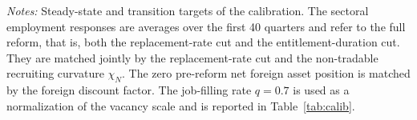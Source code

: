 \begin{table}[htbp!]
  \caption{Targets}
  \label{tab:targets}
  \centering
  \begin{small}
  \end{small}
  \begin{flushleft}
  \footnotesize \textit{Notes:} Steady-state and transition targets of the calibration. The sectoral employment responses are averages over the first 40 quarters and refer to the full reform, that is, both the replacement-rate cut and the entitlement-duration cut. They are matched jointly by the replacement-rate cut and the non-tradable recruiting curvature $\chi_N$. The zero pre-reform net foreign asset position is matched by the foreign discount factor. The job-filling rate $q=0.7$ is used as a normalization of the vacancy scale and is reported in Table~\ref{tab:calib}.
  \end{flushleft}
\end{table}
